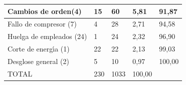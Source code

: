 \documentclass{article}
\theoremstyle{mytheoremstyle}
\theoremstyle{mytheoremstyle}
\theoremstyle{myproblemstyle}
\begin{document}
\begin{enumerate}
\begin{itemize}
\begin{table}[h!]
\begin{tabular}{|l|l|l|l|l|}
	\hline 
	\multicolumn{1}{|p{155.83218pt}}{\raggedright Cambios de orden(4)} & \multicolumn{1}{|p{61.730625pt}}{\raggedright 15} & \multicolumn{1}{|p{48.18pt}}{\raggedright 60} & \multicolumn{1}{|p{41.404686pt}}{\raggedright 5,81} & \multicolumn{1}{|p{60.225pt}|}{\raggedright 91,87}\\ 
	\hline 
	\multicolumn{1}{|p{155.83218pt}}{\raggedright Fallo de compresor (7)} & \multicolumn{1}{|p{61.730625pt}}{\raggedright 4} & \multicolumn{1}{|p{48.18pt}}{\raggedright 28} & \multicolumn{1}{|p{41.404686pt}}{\raggedright 2,71} & \multicolumn{1}{|p{60.225pt}|}{\raggedright 94,58}\\ 
	\hline 
	\multicolumn{1}{|p{155.83218pt}}{\raggedright Huelga de empleados (24)} & \multicolumn{1}{|p{61.730625pt}}{\raggedright 1} & \multicolumn{1}{|p{48.18pt}}{\raggedright 24} & \multicolumn{1}{|p{41.404686pt}}{\raggedright 2,32} & \multicolumn{1}{|p{60.225pt}|}{\raggedright 96,90}\\ 
	\hline 
	\multicolumn{1}{|p{155.83218pt}}{\raggedright Corte de energ\'{\i}a (1)} & \multicolumn{1}{|p{61.730625pt}}{\raggedright 22} & \multicolumn{1}{|p{48.18pt}}{\raggedright 22} & \multicolumn{1}{|p{41.404686pt}}{\raggedright 2,13} & \multicolumn{1}{|p{60.225pt}|}{\raggedright 99,03}\\ 
	\hline 
	\multicolumn{1}{|p{155.83218pt}}{\raggedright Desglose general (2)} & \multicolumn{1}{|p{61.730625pt}}{\raggedright 5} & \multicolumn{1}{|p{48.18pt}}{\raggedright 10} & \multicolumn{1}{|p{41.404686pt}}{\raggedright 0,97} & \multicolumn{1}{|p{60.225pt}|}{\raggedright 100,00}\\ 
	\hline 
	\multicolumn{1}{|p{155.83218pt}}{\raggedright TOTAL} & \multicolumn{1}{|p{61.730625pt}}{\raggedright 230} & \multicolumn{1}{|p{48.18pt}}{\raggedright 1033} & \multicolumn{1}{|p{41.404686pt}}{\raggedright 100,00} & \multicolumn{1}{|p{60.225pt}|}{}\\ 
	\hline 
	

\end{tabular}
\end{table}
\end{itemize}
\end{enumerate}
\end{document}

